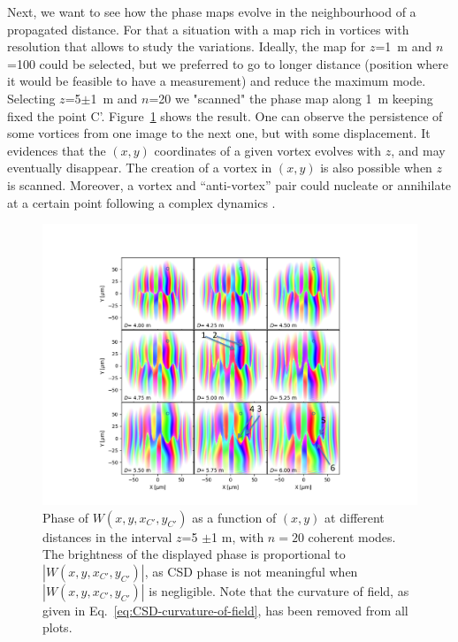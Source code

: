 \documentclass[%
 reprint,
 amsmath,amssymb,
 aps,
]{revtex4-1}
\begin{document}
Next, we want to see how the phase maps evolve in the neighbourhood of a propagated distance. For that a situation with a map rich in vortices with resolution that allows to study the variations. Ideally, the map for $z$=1~m and $n$=100 could be selected, but we preferred to go to longer distance (position where it would be feasible to have a measurement) and reduce the maximum mode. Selecting $z$=5$\pm$1~m and $n$=20 we "scanned" the phase map along 1~m keeping fixed the point C'. Figure~\ref{neighbour} shows the result. One can observe the persistence of some vortices from one image to the next one, but with some displacement. It evidences that the $(x,y)$ coordinates of a given vortex evolves with $z$, and may eventually disappear. The creation of a vortex in $(x,y)$ is also possible when $z$ is scanned. Moreover, a vortex and ``anti-vortex'' pair could nucleate or annihilate at a certain point following a complex dynamics \cite{TopologicalReactionsCohVortices, Marasinghe2011}.

\begin{figure}
\includegraphics[width=1.0\textwidth]{Figures/vx_id16a_C5_propagated_neighbour_mode0019_witharrows.png}
\caption{Phase of $W(x,y,x_{C'},y_{C'})$ as a function of $(x,y)$ at different distances in the interval $z$=5 $\pm$1 m, with $n=20$ coherent modes. The brightness of the displayed phase is proportional to $|W(x,y,x_{C'},y_{C'})|$, as CSD phase is not meaningful when $|W(x,y,x_{C'},y_{C'})|$ is negligible. Note that the curvature of field, as given in Eq.~\ref{eq:CSD-curvature-of-field}, has been removed from all plots.}
\label{neighbour}%
\end{figure}
\end{document}
